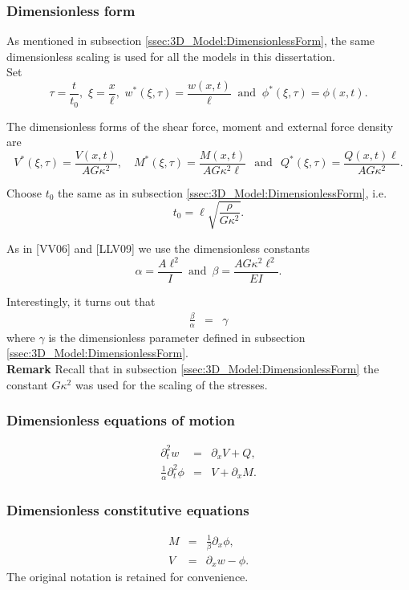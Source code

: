 \documentclass[../../main.tex]{subfiles}
\begin{document}
\subsubsection*{Dimensionless form}\label{sssec:1D_Model:DimensionlessForm}
As mentioned in subsection \ref{ssec:3D_Model:DimensionlessForm}, the same dimensionless scaling is used for all the models in this dissertation.\\

Set \[\tau = \frac{t}{t_0}, \,\, \xi = \frac{x}{\ell}, \,\, w^*(\xi,\tau) = \frac{w(x,t)}{\ell} \ \text{ and } \ \phi^*(\xi, \tau) = \phi(x,t).\]

The dimensionless forms of the shear force, moment and external force density are \[ V^{*}(\xi,\tau) = \frac{V(x,t)}{AG\kappa^2}, \quad M^{*}(\xi,\tau) = \frac{M(x,t)}{A G\kappa^2 \ell} \,\,\, \ \text{and} \ \,\,\, Q^*(\xi,\tau) = \frac{Q(x,t)\ell}{A G\kappa^2}.\]

Choose $t_0$ the same as in subsection \ref{ssec:3D_Model:DimensionlessForm}, i.e. \[t_0 = \ell\sqrt{\frac{\rho}{G\kappa^2}}.\]

As in [VV06] and [LLV09] we use the dimensionless constants
\begin{equation*}
	\alpha = \frac{A \ell^2}{I} \,\,\, \text{and} \,\,\, \beta
	=\frac{AG\kappa^2 \ell^2}{EI}.
\end{equation*}

Interestingly, it turns out that 
\begin{eqnarray*}
	\frac{\beta}{\alpha} & = & \gamma
\end{eqnarray*} where $\gamma$ is the dimensionless parameter defined in subsection \ref{ssec:3D_Model:DimensionlessForm}.\\

\textbf{Remark} Recall that in subsection \ref{ssec:3D_Model:DimensionlessForm} the constant $G\kappa^2$ was used for the scaling of the stresses.

\subsubsection*{Dimensionless equations of motion}\label{sssec:1D_Model:DimensionlessEquationsOfMotion}
\begin{eqnarray}
	\partial_{t}^{2} w &=& \partial_{x}V + Q, \label{eq:1D_Model:EquationOfMotion1D}\\
	\frac{1}{\alpha} \partial_{t}^{2} \phi &=& V + \partial_{x}M.\label{eq:1D_Model:EquationOfMotion2D}
\end{eqnarray}
\subsubsection*{Dimensionless constitutive equations}\label{sssec:1D_Model:DimensionlessConstitutiveEquations}
\begin{eqnarray}
	M &=& \frac{1}{\beta}\partial_x \phi, \label{eq:1D_Model:ConstitutiveEquations1D}\\
	V &=& \partial_x w-\phi. \label{eq:1D_Model:ConstitutiveEquations2D}
\end{eqnarray}
The original notation is retained for convenience.
\end{document}

